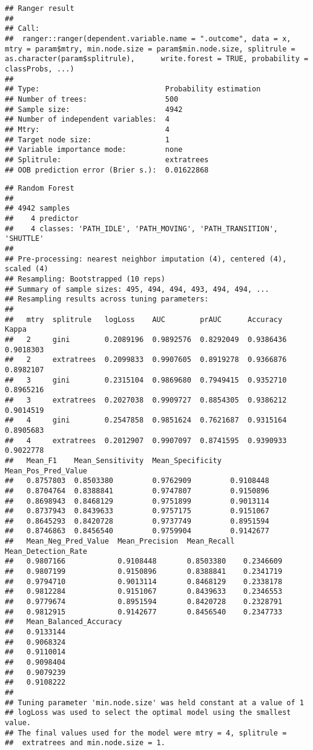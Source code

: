 \documentclass[]{article}
\begin{document}
\begin{verbatim}
## Ranger result
## 
## Call:
##  ranger::ranger(dependent.variable.name = ".outcome", data = x,      mtry = param$mtry, min.node.size = param$min.node.size, splitrule = as.character(param$splitrule),      write.forest = TRUE, probability = classProbs, ...) 
## 
## Type:                             Probability estimation 
## Number of trees:                  500 
## Sample size:                      4942 
## Number of independent variables:  4 
## Mtry:                             4 
## Target node size:                 1 
## Variable importance mode:         none 
## Splitrule:                        extratrees 
## OOB prediction error (Brier s.):  0.01622868
\end{verbatim}

\begin{verbatim}
## Random Forest 
## 
## 4942 samples
##    4 predictor
##    4 classes: 'PATH_IDLE', 'PATH_MOVING', 'PATH_TRANSITION', 'SHUTTLE' 
## 
## Pre-processing: nearest neighbor imputation (4), centered (4), scaled (4) 
## Resampling: Bootstrapped (10 reps) 
## Summary of sample sizes: 495, 494, 494, 493, 494, 494, ... 
## Resampling results across tuning parameters:
## 
##   mtry  splitrule   logLoss    AUC        prAUC      Accuracy   Kappa    
##   2     gini        0.2089196  0.9892576  0.8292049  0.9386436  0.9018303
##   2     extratrees  0.2099833  0.9907605  0.8919278  0.9366876  0.8982107
##   3     gini        0.2315104  0.9869680  0.7949415  0.9352710  0.8965216
##   3     extratrees  0.2027038  0.9909727  0.8854305  0.9386212  0.9014519
##   4     gini        0.2547858  0.9851624  0.7621687  0.9315164  0.8905683
##   4     extratrees  0.2012907  0.9907097  0.8741595  0.9390933  0.9022778
##   Mean_F1    Mean_Sensitivity  Mean_Specificity  Mean_Pos_Pred_Value
##   0.8757803  0.8503380         0.9762909         0.9108448          
##   0.8704764  0.8388841         0.9747807         0.9150896          
##   0.8698943  0.8468129         0.9751899         0.9013114          
##   0.8737943  0.8439633         0.9757175         0.9151067          
##   0.8645293  0.8420728         0.9737749         0.8951594          
##   0.8746863  0.8456540         0.9759904         0.9142677          
##   Mean_Neg_Pred_Value  Mean_Precision  Mean_Recall  Mean_Detection_Rate
##   0.9807166            0.9108448       0.8503380    0.2346609          
##   0.9807199            0.9150896       0.8388841    0.2341719          
##   0.9794710            0.9013114       0.8468129    0.2338178          
##   0.9812284            0.9151067       0.8439633    0.2346553          
##   0.9779674            0.8951594       0.8420728    0.2328791          
##   0.9812915            0.9142677       0.8456540    0.2347733          
##   Mean_Balanced_Accuracy
##   0.9133144             
##   0.9068324             
##   0.9110014             
##   0.9098404             
##   0.9079239             
##   0.9108222             
## 
## Tuning parameter 'min.node.size' was held constant at a value of 1
## logLoss was used to select the optimal model using the smallest value.
## The final values used for the model were mtry = 4, splitrule =
##  extratrees and min.node.size = 1.
\end{verbatim}
\end{document}
